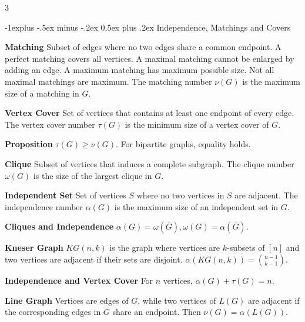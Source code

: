 \documentclass[10pt, landscape]{article}
\makeatletter
\renewcommand{\section}{\@startsection{section}{1}{0mm}%
                                {-1ex plus -.5ex minus -.2ex}%
                                {0.5ex plus .2ex}%
                                {\normalfont\large\bfseries}}
\renewcommand{\section}{\@startsection{section}{2}{0mm}%
                                {-1explus -.5ex minus -.2ex}%
                                {0.5ex plus .2ex}%
                                {\normalfont\normalsize\bfseries}}
\makeatother
\begin{document}
\begin{multicols*}{3}

\section{Independence, Matchings and Covers}

\textbf{Matching} Subset of edges where no two edges share a common endpoint. A perfect matching covers all vertices. A maximal matching cannot be enlarged by adding an edge. A maximum matching has maximum possible size. Not all maximal matchings are maximum. The matching number $\nu(G)$ is the maximum size of a matching in $G$.

\textbf{Vertex Cover} Set of vertices that contains at least one endpoint of every edge. The vertex cover number $\tau(G)$ is the minimum size of a vertex cover of $G$.

\textbf{Proposition} $\tau(G) \geq \nu(G)$. For bipartite graphs, equality holds.

\textbf{Clique} Subset of vertices that induces a complete subgraph. The clique number $\omega(G)$ is the size of the largest clique in $G$.

\textbf{Independent Set} Set of vertices $S$ where no two vertices in $S$ are adjacent. The independence number $\alpha(G)$ is the maximum size of an independent set in $G$.

\textbf{Cliques and Independence} $\alpha(G)=\omega(\overline{G}), \omega(G)=\alpha(\overline{G})$.

\textbf{Kneser Graph} $KG(n, k)$ is the graph where vertices are $k$-subsets of $[n]$ and two vertices are adjacent if their sets are disjoint. $\alpha(KG(n,k))={n-1 \choose k-1}$.

\textbf{Independence and Vertex Cover} For $n$ vertices, $\alpha(G)+\tau(G)=n$.

\textbf{Line Graph} Vertices are edges of $G$, while two vertices of $L(G)$ are adjacent if the corresponding edges in $G$ share an endpoint. Then $\nu(G)=\alpha(L(G))$.




\end{multicols*}
\end{document}
